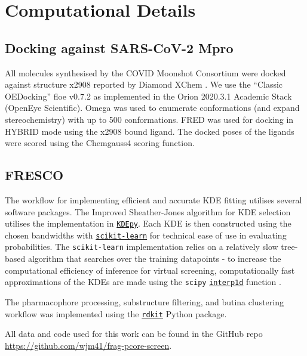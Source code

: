 
\chapter{Computational Details} \label{appendix:details}

\section{Docking against SARS-CoV-2 Mpro} \label{appendix:docking}
All molecules synthesised by the COVID Moonshot Consortium were docked against structure x2908 reported by Diamond XChem \cite{Douangamath2020XChem}. We use the “Classic OEDocking” floe v0.7.2 as implemented in the Orion 2020.3.1 Academic Stack (OpenEye Scientific). Omega was used to enumerate conformations (and expand stereochemistry) with up to 500 conformations. FRED was used for docking in HYBRID mode using the x2908 bound ligand. The docked poses of the ligands were scored using the Chemgauss4 scoring function.

\section{FRESCO} \label{appendix:fresco}

The workflow for implementing efficient and accurate KDE fitting utilises several software packages. The Improved Sheather-Jones algorithm for KDE selection utilises the implementation in \href{https://kdepy.readthedocs.io/en/latest/index.html}{\texttt{KDEpy}}. Each KDE is then constructed using the chosen bandwidths with \href{https://scikit-learn.org/stable/}{\texttt{scikit-learn}} \cite{scikit-learn} for technical ease of use in evaluating probabilities. The \texttt{scikit-learn} implementation relies on a relatively slow tree-based algorithm that searches over the training datapoints - to increase the computational efficiency of inference for virtual screening, computationally fast approximations of the KDEs are made using the \texttt{scipy} \href{https://docs.scipy.org/doc/scipy/reference/generated/scipy.interpolate.interp1d.html#scipy.interpolate.interp1d}{\texttt{interp1d}} function \cite{scipy}.

The pharmacophore processing, substructure filtering, and butina clustering workflow was implemented using the \href{https://www.rdkit.org/docs/index.html}{\texttt{rdkit}} \cite{rdkit} Python package.

All data and code used for this work can be found in the GitHub repo \url{https://github.com/wjm41/frag-pcore-screen}.

